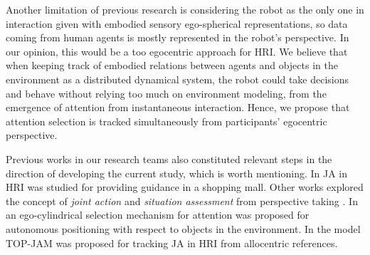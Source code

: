 \documentclass[letterpaper, 10 pt, conference]{ieeeconf}  %
\begin{document}
	
	
	
	
	Another limitation of previous research is considering the robot as the only one in interaction given with embodied sensory ego-spherical representations, so data coming from human agents is mostly represented in the robot's perspective. In our opinion, this would be a too egocentric approach for HRI. We believe that when keeping track of embodied relations between agents and objects in the environment as a distributed dynamical system, the robot could take decisions and behave without relying too much on environment modeling, from the emergence of attention from instantaneous interaction. Hence, we propose that attention selection is tracked simultaneously from participants' egocentric perspective. 
	 
	Previous works in our research teams also constituted relevant steps in the direction of developing the current study, which is worth mentioning. In \cite{heikkila2019} JA in HRI was studied for providing guidance in a shopping mall. Other works explored the concept of \textit{joint action} \cite{belhassein2022} and \textit{situation assessment} from perspective taking \cite{sallami2019}. In \cite{chame2016} an ego-cylindrical selection mechanism for attention was proposed for autonomous positioning with respect to objects in the environment. In \cite{chame2023top} the model TOP-JAM was proposed for tracking JA in HRI from allocentric references.  %
	
	 
\end{document}
